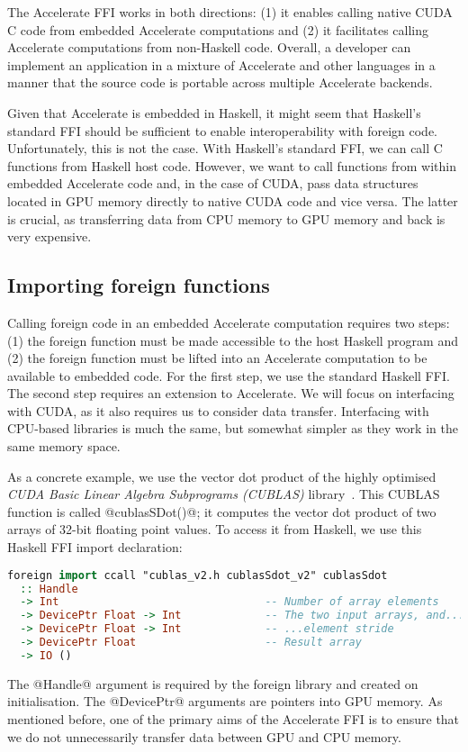 The Accelerate FFI works in both directions: (1) it enables calling native CUDA C code from embedded Accelerate computations and (2) it facilitates calling Accelerate computations from non-Haskell code. Overall, a developer can implement an application in a mixture of Accelerate and other languages in a manner that the source code is portable across multiple Accelerate backends.

Given that Accelerate is embedded in Haskell, it might seem  that Haskell's standard FFI should be sufficient to enable interoperability with foreign code. Unfortunately, this is not the case. With Haskell's standard FFI, we can call C functions from Haskell host code. However, we want to call functions from within embedded Accelerate code and, in the case of CUDA, pass data structures located in GPU memory directly to native CUDA code and vice versa. The latter is crucial, as transferring data from CPU memory to GPU memory and back is very expensive.

\subsection{Importing foreign functions}
\label{sec:foreign-import}

Calling foreign code in an embedded Accelerate computation requires two steps: (1) the foreign function must be made accessible to the host Haskell program and (2) the foreign function must be lifted into an Accelerate computation to be available to embedded code. For the first step, we use the standard Haskell FFI. The second step requires an extension to Accelerate. We will focus on interfacing with CUDA, as it also requires us to consider data transfer. Interfacing with CPU-based libraries is much the same, but somewhat simpler as they work in the same memory space.

As a concrete example, we use the vector dot product of the highly optimised \emph{CUDA Basic Linear Algebra Subprograms (CUBLAS)} library~\cite{cublas}. This CUBLAS function is called @cublasSDot()@; it computes the vector dot product of two arrays of 32-bit floating point values. To access it from Haskell, we use this Haskell FFI import declaration:
%
\begin{lstlisting}[language=haskell]
foreign import ccall "cublas_v2.h cublasSdot_v2" cublasSdot
  :: Handle
  -> Int                                -- Number of array elements
  -> DevicePtr Float -> Int             -- The two input arrays, and...
  -> DevicePtr Float -> Int             -- ...element stride
  -> DevicePtr Float                    -- Result array
  -> IO ()
\end{lstlisting}
%
The @Handle@ argument is required by the foreign library and created on
initialisation. The @DevicePtr@ arguments are pointers into GPU memory. As mentioned before, one of the primary aims of the Accelerate FFI is to ensure that we do not unnecessarily transfer data between GPU and CPU memory.

